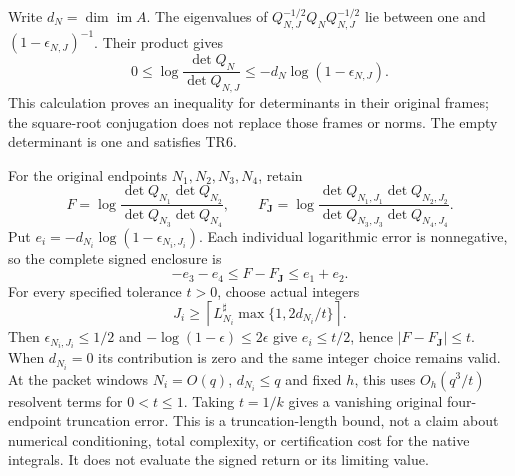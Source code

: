 \documentclass[11pt]{article}
\begin{document}
Write $d_N=\dim\operatorname{im}A$. The eigenvalues of
$Q_{N,J}^{-1/2}Q_NQ_{N,J}^{-1/2}$ lie between one and
$(1-\epsilon_{N,J})^{-1}$. Their product gives
\begin{equation}\tag{TR6}\label{eq:det}
 0\le\log\frac{\det Q_N}{\det Q_{N,J}}
                 \le-d_N\log(1-\epsilon_{N,J}).
\end{equation}
This calculation proves an inequality for determinants in their
original frames; the square-root conjugation does not replace those
frames or norms. The empty determinant is one and satisfies TR6.

For the original endpoints $N_1,N_2,N_3,N_4$, retain
\[
 F=\log\frac{\det Q_{N_1}\det Q_{N_2}}
                  {\det Q_{N_3}\det Q_{N_4}},\qquad
 F_{\mathbf J}=\log\frac{\det Q_{N_1,J_1}\det Q_{N_2,J_2}}
                  {\det Q_{N_3,J_3}\det Q_{N_4,J_4}}.
\]
Put $e_i=-d_{N_i}\log(1-\epsilon_{N_i,J_i})$. Each individual
logarithmic error is nonnegative, so the complete signed enclosure is
\begin{equation}\tag{TR7}\label{eq:four}
 -e_3-e_4\le F-F_{\mathbf J}\le e_1+e_2.
\end{equation}
For every specified tolerance $t>0$, choose actual integers
\begin{equation}\tag{TR8}\label{eq:J}
 J_i\ge\left\lceil L_{N_i}^\sharp\max\{1,2d_{N_i}/t\}\right\rceil.
\end{equation}
Then $\epsilon_{N_i,J_i}\le1/2$ and
$-\log(1-\epsilon)\le2\epsilon$ give $e_i\le t/2$, hence
$|F-F_{\mathbf J}|\le t$. When $d_{N_i}=0$ its contribution is
zero and the same integer choice remains valid. At the packet
windows $N_i=O(q)$, $d_{N_i}\le q$ and fixed $h$, this uses
$O_h(q^3/t)$ resolvent terms for $0<t\le1$. Taking $t=1/k$ gives
a vanishing original four-endpoint truncation error. This is a
truncation-length bound, not a claim about numerical conditioning,
total complexity, or certification cost for the native integrals.
It does not evaluate the signed return or its limiting value.
\end{document}
